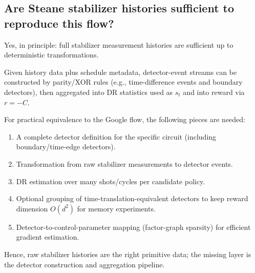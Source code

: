 \documentclass[11pt]{article}
\begin{document}
\subsection*{Are Steane stabilizer histories sufficient to reproduce this flow?}
Yes, in principle: full stabilizer measurement histories are sufficient up to deterministic transformations.

Given history data plus schedule metadata, detector-event streams can be constructed by parity/XOR rules (e.g., time-difference events and boundary detectors), then aggregated into DR statistics used as $s_t$ and into reward via $r=-C$.

For practical equivalence to the Google flow, the following pieces are needed:
\begin{enumerate}
\item A complete detector definition for the specific circuit (including boundary/time-edge detectors).
\item Transformation from raw stabilizer measurements to detector events.
\item DR estimation over many shots/cycles per candidate policy.
\item Optional grouping of time-translation-equivalent detectors to keep reward dimension $O(d^2)$ for memory experiments.
\item Detector-to-control-parameter mapping (factor-graph sparsity) for efficient gradient estimation.
\end{enumerate}

Hence, raw stabilizer histories are the right primitive data; the missing layer is the detector construction and aggregation pipeline.
\end{document}
